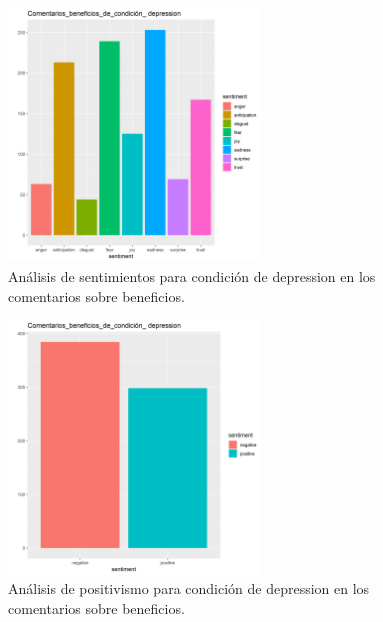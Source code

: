 \documentclass[spanish,]{article}
\begin{document}
\begin{figure}[h]
    \centering
    \includegraphics[width=0.6\textwidth]{figuras/sentimientos/Adepression1.png}
    \caption{Análisis de sentimientos para condición de depression en los comentarios sobre beneficios.}
    \label{fig:sentimientos:17}
\end{figure}

\begin{figure}[h]
    \centering
    \includegraphics[width=0.6\textwidth]{figuras/sentimientos/Adepression2.png}
    \caption{Análisis de positivismo para condición de depression en los comentarios sobre beneficios.}
    \label{fig:sentimientos:18}
\end{figure}
\end{document}

